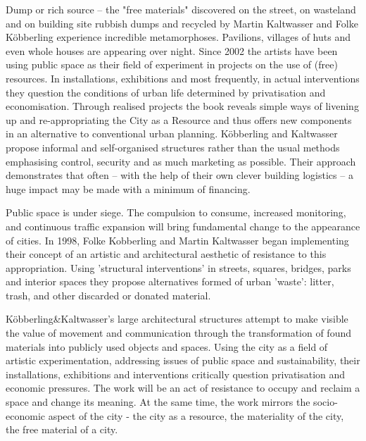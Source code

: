 \begin{itemize}

Dump or rich source – the "free materials" discovered on the street, on wasteland and on building site rubbish dumps and recycled by Martin Kaltwasser and Folke Köbberling experience incredible metamorphoses. Pavilions, villages of huts and even whole houses are appearing over night. Since 2002 the artists have been using public space as their field of experiment in projects on the use of (free) resources. In installations, exhibitions and most frequently, in actual interventions they question the conditions of urban life determined by privatisation and economisation. Through realised projects the book reveals simple ways of livening up and re-appropriating the City as a Resource and thus offers new components in an alternative to conventional urban planning. Köbberling and Kaltwasser propose informal and self-organised structures rather than the usual methods emphasising control, security and as much marketing as possible. Their approach demonstrates that often – with the help of their own clever building logistics – a huge impact may be made with a minimum of financing.

Public space is under siege. The compulsion to consume, increased monitoring, and continuous traffic expansion will bring fundamental change to the appearance of cities. In 1998, Folke Kobberling and Martin Kaltwasser began implementing their concept of an artistic and architectural aesthetic of resistance to this appropriation. Using 'structural interventions' in streets, squares, bridges, parks and interior spaces they propose alternatives formed of urban 'waste': litter, trash, and other discarded or donated material. 

Köbberling\&Kaltwasser’s large architectural structures attempt to make visible the value of movement and communication through the transformation of found materials into publicly used objects and spaces. Using the city as a field of artistic experimentation, addressing issues of public space and sustainability, their installations, exhibitions and interventions critically question privatisation and economic pressures. The work will be an act of resistance to occupy and reclaim a space and change its meaning. At the same time, the work mirrors the socio-economic aspect of the city - the city as a resource, the materiality of the city, the free material of a city. 


\end{itemize}
